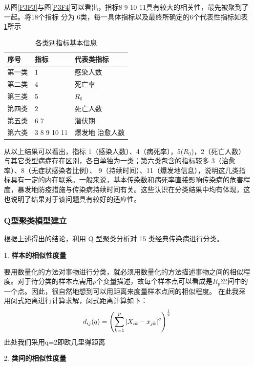 \documentclass[a4paper, 11pt,twoside=true,UTF8]{scrartcl}
\begin{document}
从图\ref{P3F3}与图\ref{P3F4}可以看出，指标8 9 10 11具有较大的相关性，最先被聚到了一起。将18个指标 分为 6类，每一具体指标以及最终所确定的6个代表性指标如表\ref{P3T3}所示

\begin{table}[h]
	\centering
	\caption{各类别指标基本信息} \label{P3T3}
	\begin{tabular}{lll}
		\hline
		\textbf{序号} & \textbf{指标} & \textbf{代表类指标} \\ \hline
		第一类         & 1           & 感染人数           \\
		第二类         & 4           & 死亡率            \\
		第三类         & 5           & $R_0$             \\
		第四类         & 2           & 死亡人数           \\
		第五类         & 6 7         & 潜伏期            \\
		第六类         & 3 8 9 10 11 & 爆发地 治愈人数       \\ \hline
	\end{tabular}
\end{table}
从以上结果可以看出，指标 1（感染人数）、4（病死率），5($R_0$)，2（死亡人数）与其它类型病症存在区别，各自单独为一类；第六类包含的指标较多 3（治愈率）、8（无症状感染者比例）、 9（持续时间）、11（爆发地信息），说明这几类指标具有一定的内在联系。一般来说，基本传染数和病死率直接影响传染病的危害程度，暴发地防疫措施与传染病持续时间有关。这些认识在分类结果中均有体现，这也说明了结果对于该问题具有较好的适应性。

\subsubsection{Q型聚类模型建立}
根据上述得出的结论，利用 Q 型聚类分析对 15 类经典传染病进行分类。

1. \textbf{样本的相似性度量}

要用数量化的方法对事物进行分类，就必须用数量化的方法描述事物之间的相似程度。对于待分类的样本点需用$p$个变量描述，故每个样本点可以看成是$R_p$空间中的一个点。因此，很自然地想到可以用距离来度量样本点间的相似程度。 在此我采用闵式距离进行计算求解，闵式距离计算如下：
$$
\begin{aligned}
\centering
d_{ij}(q)=\left( \sum_{k=1}^p \left|X_{ik}-x_{jk}\right|^q \right)^{\frac{1}{q}}
\end{aligned}
$$
此处我们采用q=2即欧几里得距离

2. \textbf{类间的相似性度量}
\end{document}

